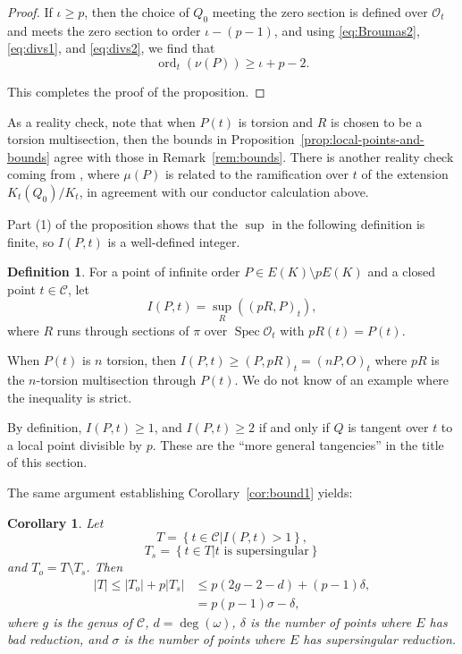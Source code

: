 \documentclass[12pt,reqno]{amsart}
\numberwithin{equation}{section}
\theoremstyle{plain}
\newtheorem{cor}[subsection]{Corollary}
\theoremstyle{definition}
\newtheorem{defn}[subsection]{Definition}
\theoremstyle{remark}
\newcommand{\CC}{\mathcal{C}}
\newcommand{\OO}{\mathcal{O}}
\newcommand{\<}{\langle}
\renewcommand{\>}{\rangle}
\DeclareMathOperator{\ord}{ord}
\DeclareMathOperator{\spec}{Spec}
\numberwithin{equation}{section}
\begin{document}
\begin{proof}
If $\iota\ge p$, then the choice of $Q_0$ meeting the zero section is
defined over $\OO_t$ and meets the zero section to order
$\iota-(p-1)$, and using \eqref{eq:Broumas2}, \eqref{eq:divs1}, and
\eqref{eq:divs2}, we find that
\[\ord_t(\nu(P))\ge \iota+p-2.\]

This completes the proof of the proposition.
\end{proof}

As a reality check, note that when $P(t)$ is torsion and $R$ is chosen
to be a torsion multisection, then the bounds in
Proposition~\ref{prop:local-points-and-bounds} agree with
those in Remark~\ref{rem:bounds}.  There is another reality
check coming from \cite[Thm.~5.5]{Ulmer91}, where $\mu(P)$ is related
to the ramification over $t$ of the extension $K_t(Q_0)/K_t$, in
agreement with our conductor calculation above.

Part (1) of the proposition shows that the $\sup$ in the following
definition is finite, so $I(P,t)$ is a well-defined integer.

\begin{defn}\label{def:I}
  For a point of infinite order $P\in E(K)\setminus pE(K)$ and a
  closed point $t\in\CC$, let
  \[I(P,t)=\sup_{R}\left((pR,P)_t\right),\]
  where $R$ runs through sections of $\pi$ over $\spec\OO_t$ with
  $pR(t)=P(t)$.
\end{defn}

When $P(t)$ is $n$ torsion, then $I(P,t)\ge(P,pR)_t=(nP,O)_t$ where
$pR$ is the $n$-torsion multisection through $P(t)$.  We do not know
of an example where the inequality is strict.

By definition, $I(P,t)\ge1$, and $I(P,t)\ge2$ if and only if $Q$ is
tangent over $t$ to a local point divisible by $p$.  These are the
``more general tangencies'' in the title of this section.  

The same argument establishing Corollary~\ref{cor:bound1} yields:

\begin{cor}
  Let
  \[T=\left\{t\in\CC\left| I(P,t)>1\right.\right\},\]
    \[T_s=\left\{t\in T\left| \text{$t$ is supersingular}\right.\right\}\]
    and $T_o=T\setminus T_s$.  Then
    \begin{align*}
      |T|\le |T_o|+p|T_s|&\le p(2g-2-d)+(p-1)\delta,\\
      &=p(p-1)\sigma-\delta,
    \end{align*}
    where $g$ is the genus of $\CC$, $d=\deg(\omega)$, $\delta$ is the
    number of points 
    where $E$ has bad reduction, and $\sigma$ is the number of points
    where $E$ has supersingular reduction.
\end{cor}
\end{document}
